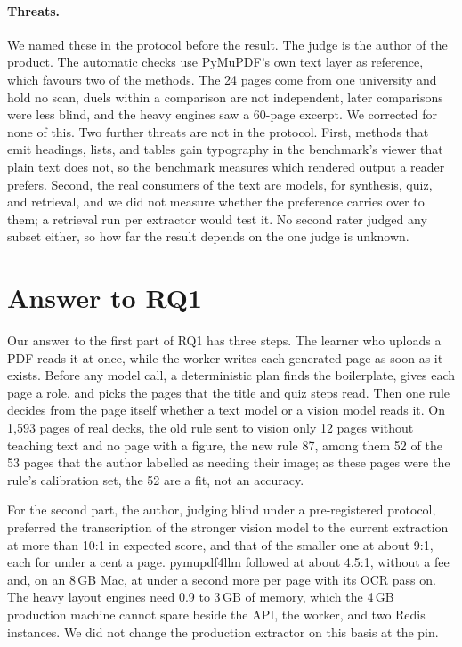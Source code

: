 \paragraph{Threats.} We named these in the protocol before the result. The
judge is the author of the product. The automatic checks use PyMuPDF's own
text layer as reference, which favours two of the methods. The 24 pages come
from one university and hold no scan, duels within a comparison are not
independent, later comparisons were less blind, and the heavy engines saw a
60-page excerpt.
We corrected for none of this. Two further threats are not in the protocol.
First, methods that emit headings, lists, and tables gain typography in the
benchmark's viewer that plain text does not, so the benchmark measures which
rendered output a reader prefers. Second, the real consumers of the text are
models, for synthesis, quiz, and retrieval, and we did not measure whether the
preference carries over to them; a retrieval run per extractor would test it.
No second rater judged any subset either, so how far the result depends on the
one judge is unknown.

\section{Answer to RQ1}
\label{sec:c4-answer}

Our answer to the first part of RQ1 has three steps. The learner who uploads
a PDF reads it at once, while the worker writes each generated page as soon as
it exists. Before any model call, a deterministic plan finds the boilerplate,
gives each page a role, and picks the pages that the title and quiz steps
read. Then one rule decides from the page itself whether a text model or a
vision model reads it. On 1{,}593 pages of real decks, the old rule sent to
vision only 12 pages without teaching text and no page with a figure, the new
rule 87, among them 52 of the 53 pages that the author labelled as needing
their image; as these pages were the rule's calibration set, the 52 are a fit,
not an accuracy.

For the second part, the author, judging blind under a pre-registered
protocol, preferred the transcription of the stronger vision model to the
current extraction at more than 10:1 in expected score, and that of the
smaller one at about 9:1, each for under a cent a page. pymupdf4llm followed
at about 4.5:1, without a fee and, on an 8\,GB Mac, at under a second more per
page with its OCR pass on. The heavy layout engines need 0.9 to 3\,GB of
memory, which the 4\,GB production machine cannot spare beside the API, the
worker, and two Redis instances. We did not change the production extractor on
this basis at the pin.


